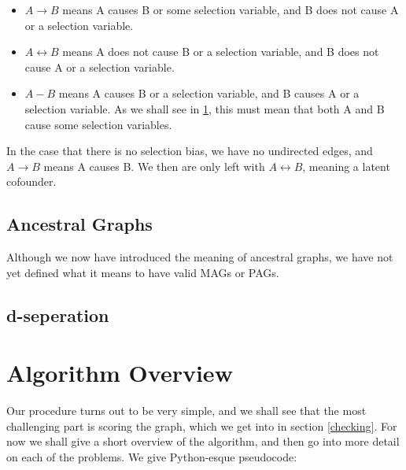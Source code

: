 \documentclass[11pt,a4paper]{report}
\begin{document}
\begin{itemize}
  \item $A \rightarrow B$ means A causes B or some selection variable, and B
    does not cause A or a selection variable.

  \item $A \leftrightarrow B$ means A does not cause B or a selection
    variable, and B does not cause A or a selection variable.

  \item $A - B$ means A causes B or a selection variable, and B causes A
    or a selection variable. As we shall see in
    \ref{sec:ancestral_graphs}, this must mean that both A and B cause
    some selection variables.
\end{itemize}

In the case that there is no selection bias, we have no undirected edges,
and $A \rightarrow B$ means A causes B. We then are only left with $A
\leftrightarrow B$, meaning a latent cofounder.

\section{Ancestral Graphs}\label{sec:ancestral_graphs}
Although we now have introduced the meaning of ancestral graphs, we have
not yet defined what it means to have valid MAGs or PAGs.

\section{d-seperation}

\chapter{Algorithm Overview}\label{algorithm}
Our procedure turns out to be very simple, and we shall see that the most
challenging part is scoring the graph, which we get into in section
\ref{checking}. For now we shall give a short overview of the algorithm,
and then go into more detail on each of the problems. We give Python-esque
pseudocode:
\end{document}

